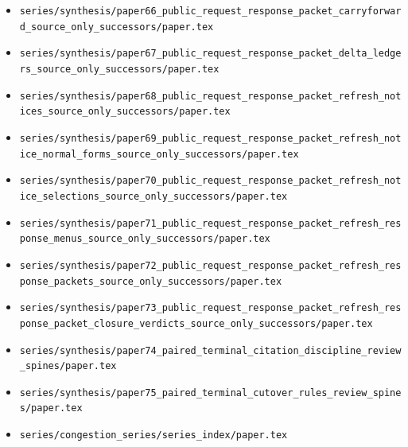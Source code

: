\documentclass[11pt]{article}
\begin{document}
\begin{itemize}[leftmargin=*]
\item \texttt{series/synthesis/paper66\_public\_request\_response\_packet\_carryforward\_source\_only\_successors/paper.tex}
\item \texttt{series/synthesis/paper67\_public\_request\_response\_packet\_delta\_ledgers\_source\_only\_successors/paper.tex}
\item \texttt{series/synthesis/paper68\_public\_request\_response\_packet\_refresh\_notices\_source\_only\_successors/paper.tex}
\item \texttt{series/synthesis/paper69\_public\_request\_response\_packet\_refresh\_notice\_normal\_forms\_source\_only\_successors/paper.tex}
\item \texttt{series/synthesis/paper70\_public\_request\_response\_packet\_refresh\_notice\_selections\_source\_only\_successors/paper.tex}
\item \texttt{series/synthesis/paper71\_public\_request\_response\_packet\_refresh\_response\_menus\_source\_only\_successors/paper.tex}
\item \texttt{series/synthesis/paper72\_public\_request\_response\_packet\_refresh\_response\_packets\_source\_only\_successors/paper.tex}
\item \texttt{series/synthesis/paper73\_public\_request\_response\_packet\_refresh\_response\_packet\_closure\_verdicts\_source\_only\_successors/paper.tex}
\item \texttt{series/synthesis/paper74\_paired\_terminal\_citation\_discipline\_review\_spines/paper.tex}
\item \texttt{series/synthesis/paper75\_paired\_terminal\_cutover\_rules\_review\_spines/paper.tex}
\item \texttt{series/congestion\_series/series\_index/paper.tex}
\end{itemize}
\end{document}
